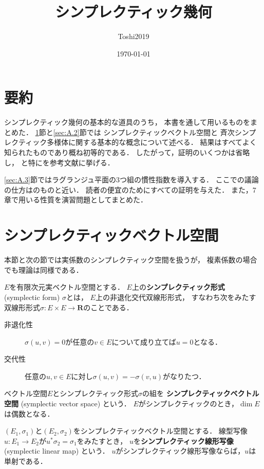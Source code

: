 \documentclass[leqno, 10pt, a4paper, dvipdfmx]{jsarticle}
\title{シンプレクティック幾何}
\author{Toshi2019}
\date{\today}
\theoremstyle{definition}
\newcommand{\rr}{\mathbf{R}}
\numberwithin{equation}{section}
\theoremstyle{mystyle}
\begin{document}
\maketitle

\section*{要約}
シンプレクティック幾何の基本的な道具のうち，
本書を通して用いるものをまとめた．
\ref{sec:A.1}節と\ref{sec:A.2}節では
シンプレクティックベクトル空間と
斉次シンプレクティック多様体に関する基本的な概念について述べる．
結果はすべてよく知られたものであり概ね初等的である．
したがって，証明のいくつかは省略し，
\cite{Ar78,Dui73,AM78}と特に\cite{Hor85}を参考文献に挙げる．

\ref{sec:A.3}節ではラグランジュ平面の3つ組の慣性指数を導入する．
ここでの議論の仕方は\cite{LV80}のものと近い．
読者の便宜のためにすべての証明を与えた．
また，7章で用いる性質を演習問題としてまとめた．

\section{シンプレクティックベクトル空間}\label{sec:A.1}

本節と次の節では実係数のシンプレクティック空間を扱うが，
複素係数の場合でも理論は同様である．

\(E\)を有限次元実ベクトル空間とする．
\(E\)上の\textbf{シンプレクティック形式} (symplectic form) \(\sigma\)とは，
\(E\)上の非退化交代双線形形式，
すなわち次をみたす双線形形式\(
    \sigma\colon E\times E\to\rr
\)のことである．
\begin{description}
    \item[非退化性] \(\sigma(u,v)=0\)が任意の\(v\in E\)について成り立てば\(u=0\)となる．
    \item[交代性] 任意の\(u,v\in E\)に対し\(\sigma(u,v)=-\sigma(v,u)\)がなりたつ．
\end{description}
ベクトル空間\(E\)とシンプレクティック形式\(\sigma\)の組を
\textbf{シンプレクティックベクトル空間} (symplectic vector space) という．
\(E\)がシンプレクティックのとき，\(\dim E\)は偶数となる．

\((E_{1},\sigma_{1})\)と\((E_{2},\sigma_{2})\)をシンプレクティックベクトル空間とする．
線型写像\(u\colon E_{1}\to E_{2}\)が\(
    u^{\ast}\sigma_{2}=\sigma_{1}
\)をみたすとき，
\(u\)を\textbf{シンプレクティック線形写像} (symplectic linear map) という．
\(u\)がシンプレクティック線形写像ならば，\(u\)は単射である．
\end{document}
